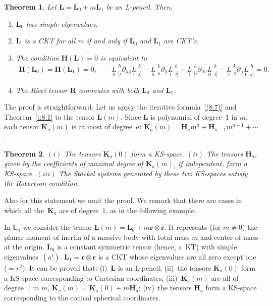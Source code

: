 \documentclass[10pt,a4paper]{amsart}
\def\bs{\boldsymbol}
\numberwithin{equation}{section}
\newtheorem{Theorem}{Theorem}[section]
 { \theoremstyle{definition}
\newtheorem{Notation}[Theorem]{Notation}
\newtheorem{Example}[Theorem]{Example}
\newtheorem{Remark}[Theorem]{Remark}
\newtheorem{Remarks}[Theorem]{Remarks}
 }
\begin{document}
\begin{Theorem}
Let $\bs L=\bs L_0+m\bs L_1$ be an L-pencil. Then:
\begin{enumerate}\itemsep=0pt
\item[$(i)$] $\bs L_0$ has simple eigenvalues.
 \item[$(ii)$] $\bs L$~is a CKT for all $m$ if and only if $\bs L_0$ and $\bs L_1$ are CKT's.

\item[$(iii)$] The condition $\bs H(\bs L)=0$ is equivalent to
 \begin{gather*}
\bs H(\bs L_0)=\bs H(\bs L_1)=0, \qquad
\underset{0}{L}{\phantom |}_{[i}^h \partial_{|h|} \underset{1}{L}{\phantom |}_{j]}^k
-\underset{0}{L}{\phantom |}_h^k \partial_{[i} \underset{1}{L}{\phantom |}_{j]}^h
+
\underset{1}{L}{\phantom |}_{[i}^h \partial_{|h|} \underset{0}{L}{\phantom |}_{j]}^k
-\underset{1}{L}{\phantom |}_h^k \partial_{[i} \underset{0}{L}{\phantom |}_{j]}^h=0.
\end{gather*}
\item[$(iv)$]  The Ricci tensor $\bs R$ commutes with both $\bs L_0$ and $\bs L_1$.
\end{enumerate}
\end{Theorem}

The proof is straightforward. Let us apply the iterative formula~\eqref{(8.7)} and Theorem~\ref{t:8.1} to the tensor $\bs L(m)$. Since $\bs L$ is polynomial of degree~1 in $m$, each tensor $\bs K_a(m)$ is at most of degree~$a$:
$\bs K_a(m)=\bs H_a m^a+\bs H_{a-1}m^{a-1}+\cdots$.

\begin{Theorem}
$(i)$ The tensors $\bs K_a(0)$ form a KS-space.
$(ii)$ The tensors $\bs H_a$, given by the coefficients of maximal degree of $\bs K_a(m)$, if independent, form a KS-space. $(iii)$ The St\"ackel systems generated by these two KS-spaces satisfy the Robertson condition.
\end{Theorem}

Also for this statement we omit the proof. We remark that there are cases in which all the~$\bs K_a$ are of degree~1, as in the following example.

\begin{Example} In $\mathbb E_n$ we consider the tensor $\bs L(m)=\bs L_0+m \bs r\otimes\bs r$. It represents (for $m\neq 0$) the planar moment of inertia of a massive body with total mass $m$ and center of mass at the origin. $\bs L_0$ is a constant symmetric tensor (hence, a~KT) with simple eigenvalues~$(a^i)$. $\bs L_1=\bs r\otimes \bs r$ is a CKT whose eigenvalues are all zero except one ($={}r^2$). It can be proved that: (i)~$\bs L$ is an L-pencil; (ii)~the tensors $\bs K_a(0)$ form a KS-space corresponding to Cartesian coordinates; (iii)~$\bs K_a(m)$ are all of degree~1 in $m$, $\bs K_a(m)=\bs K_a(0)+m \bs H_a$; (iv)~the tensors $\bs H_a$ form a KS-space corresponding to the conical spherical coordinates.
\end{Example}
\end{document}
